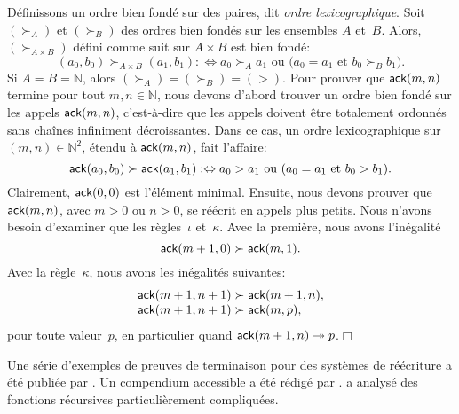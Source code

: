 Définissons un ordre bien fondé sur des paires, dit \emph{ordre
  lexicographique}. Soit
\((\succ_A)\) et \((\succ_B)\) des ordres bien fondés sur les
ensembles \(A\) et~\(B\). Alors, \((\succ_{A \times B})\) défini
comme suit sur \(A \times B\) est bien fondé:
\begin{equation}
(a_0,b_0) \succ_{A \times B} (a_1,b_1) :\Leftrightarrow \text{\(a_0
    \succ_A a_1\) ou (\(a_0 = a_1\) et \(b_0 \succ_B b_1\)).}
\label{def:lexico}
\end{equation}
Si \(A=B=\mathbb{N}\), alors \((\succ_A) = (\succ_B) = (>)\). Pour
prouver que \(\textsf{ack}(m,n)\) termine pour tout \(m,n \in
\mathbb{N}\), nous devons d'abord trouver un ordre bien fondé sur les
appels \(\textsf{ack}(m,n)\), c'est-à-dire que les appels doivent être
totalement ordonnés sans chaînes infiniment décroissantes. Dans ce
cas, un ordre lexicographique sur \((m,n) \in \mathbb{N}^2\), étendu à
\(\textsf{ack}(m,n)\), fait l'affaire:
\begin{equation*}
\textsf{ack}(a_0,b_0) \succ \textsf{ack}(a_1,b_1) :\Leftrightarrow
\text{\(a_0 > a_1\) ou (\(a_0 = a_1\) et \(b_0 > b_1\)).}
\end{equation*}
Clairement, \(\textsf{ack}(0,0)\) est l'élément minimal. Ensuite, nous
devons prouver que \(\textsf{ack}(m,n)\), avec \(m > 0\) ou \(n > 0\), se
réécrit en appels plus petits. Nous n'avons besoin d'examiner que les
règles~\(\iota\) et~\(\kappa\). Avec la première, nous avons
l'inégalité
\begin{equation*}
  \textsf{ack}(m+1,0) \succ \textsf{ack}(m,1).
\end{equation*}
Avec la règle~\(\kappa\), nous avons les inégalités suivantes:
\begin{equation*}
  \begin{array}{@{}r@{\;}l@{\;}l@{}}
    \fun{ack}(m+1,n+1) & \succ & \fun{ack}(m+1,n),\\
    \fun{ack}(m+1,n+1) & \succ & \fun{ack}(m,p),
  \end{array}
\end{equation*}
pour toute valeur~\(p\), en particulier quand \(\textsf{ack}(m+1,n)
\twoheadrightarrow p\).\hfill\(\Box\)

Une série d'exemples de preuves de
terminaison pour des systèmes de réécriture a été
publiée par \cite{Dershowitz_1995,ArtsGiesl_2001}. Un compendium
accessible a été rédigé par \cite{Dershowitz_1987}. \cite{Knuth_2000a}
a analysé des fonctions récursives particulièrement compliquées.

